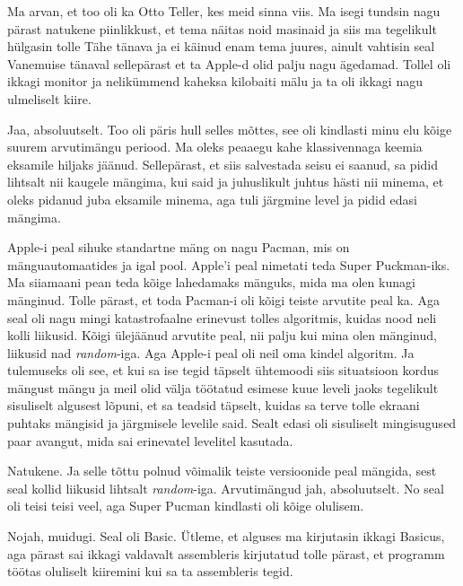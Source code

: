 Ma arvan, et too oli ka Otto Teller, kes meid sinna viis. Ma isegi tundsin nagu 
pärast natukene piinlikkust, et tema näitas noid masinaid ja siis ma tegelikult 
hülgasin tolle Tähe tänava ja ei käinud enam tema juures, ainult vahtisin seal 
Vanemuise tänaval sellepärast et ta Apple-d olid palju nagu ägedamad. Tollel 
oli ikkagi monitor ja nelikümmend kaheksa kilobaiti mälu  ja ta oli ikkagi nagu 
ulmeliselt kiire.


Jaa,  absoluutselt. Too oli päris hull selles mõttes, see oli kindlasti minu 
elu kõige suurem arvutimängu periood. Ma oleks peaaegu kahe klassivennaga 
keemia eksamile hiljaks jäänud. Sellepärast, et siis salvestada seisu ei 
saanud, sa pidid lihtsalt nii kaugele mängima, kui said ja juhuslikult juhtus 
hästi nii minema, et oleks pidanud juba eksamile minema, aga tuli järgmine 
level ja pidid edasi mängima.


Apple-i peal sihuke standartne mäng on nagu Pacman, mis on mänguautomaatides ja 
igal pool. Apple'i peal nimetati teda Super Puckman-iks. Ma siiamaani pean teda kõige lahedamaks mänguks, mida ma olen kunagi 
mänginud. Tolle pärast, et toda Pacman-i oli kõigi teiste arvutite peal ka. Aga 
 seal oli nagu mingi katastrofaalne  erinevust tolles algoritmis, kuidas nood 
neli kolli liikusid. Kõigi ülejäänud arvutite peal, nii palju kui mina olen 
mänginud, liikusid nad \emph{random}-iga. Aga Apple-i peal oli neil oma kindel 
algoritm. Ja tulemuseks oli see, et kui sa ise tegid täpselt ühtemoodi siis 
situatsioon kordus mängust mängu ja meil olid välja töötatud esimese kuue 
leveli jaoks tegelikult sisuliselt algusest lõpuni, et sa teadsid täpselt, 
kuidas sa terve tolle ekraani puhtaks mängisid ja järgmisele levelile said. 
Sealt edasi oli sisuliselt mingisugused paar avangut, mida sai erinevatel 
levelitel kasutada.


Natukene. Ja selle tõttu polnud võimalik teiste versioonide peal mängida, sest 
seal kollid liikusid lihtsalt  \emph{random}-iga. Arvutimängud jah, 
absoluutselt. No seal oli teisi teisi veel, aga Super Pucman kindlasti oli 
kõige olulisem.


Nojah, muidugi. Seal oli Basic. Ütleme, et alguses ma 
kirjutasin ikkagi Basicus, aga pärast sai ikkagi valdavalt 
assembleris kirjutatud tolle pärast, et programm töötas 
oluliselt kiiremini kui sa ta assembleris tegid. 

